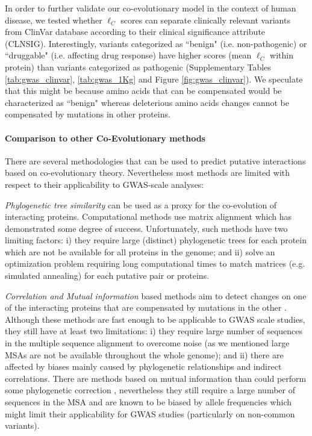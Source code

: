 In order to further validate our co-evolutionary model in the context of human disease, we tested whether $\ell_C$ scores can separate clinically relevant variants from ClinVar database \cite{landrum2013clinvar} according to their clinical significance attribute (CLNSIG). 
Interestingly, variants categorized as ``benign" (i.e. non-pathogenic) or ``druggable" (i.e. affecting drug response) have higher scores (mean $\ell_C$ within protein) than variants categorized as pathogenic (Supplementary Tables \ref{tab:gwas_clinvar}, \ref{tab:gwas_1Kg} and Figure \ref{fig:gwas_clinvar}). 
We speculate that this might be because amino acids that can be compensated would be characterized as ``benign" whereas deleterious amino acids changes cannot be compensated by mutations in other proteins. 

\paragraph{Comparison to other Co-Evolutionary methods}
There are several methodologies that can be used to predict putative interactions based on co-evolutionary theory.
Nevertheless most methods are limited with respect to their applicability to GWAS-scale analyses:

\textit{Phylogenetic tree similarity} can be used as a proxy for the co-evolution of interacting proteins. 
Computational methods use matrix alignment \cite{ramani2003exploiting} which has demonstrated some degree of success. 
Unfortunately, such methods have two limiting factors: 
i) they require large (distinct) phylogenetic trees for each protein which are not be available for all proteins in the genome; and 
ii) solve an optimization problem requiring long computational times to match matrices (e.g. simulated annealing) for each putative pair or proteins.

\textit{Correlation and Mutual information} based methods aim to detect changes on one of the interacting proteins that are compensated by mutations in the other \cite{pazos1997correlated,gobel1994correlated}. 
Although these methods are fast enough to be applicable to GWAS scale studies, they still have at least two limitations: 
i) they require large number of sequences in the multiple sequence alignment to overcome noise (as we mentioned large MSAs are not be available throughout the whole genome); and 
ii) there are affected by biases mainly caused by phylogenetic relationships and indirect correlations. 
There are methods based on mutual information than could perform some phylogenetic correction \cite{de2013emerging}, nevertheless they still require a large number of sequences in the MSA and are known to be biased by allele frequencies \cite{dunn2008mutual} which might limit their applicability for GWAS studies (particularly on non-common variants).
    
